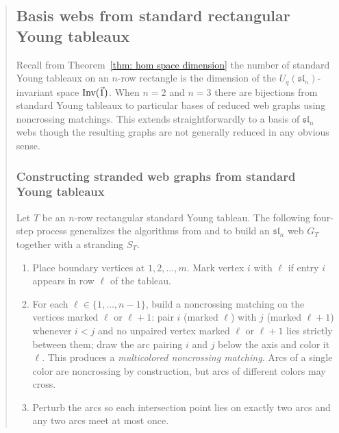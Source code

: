 \documentclass[letterpaper,11pt]{amsart}
\newcommand{\uq}{U_q(\mathfrak{sl}_n)} %
\begin{document}
\begin{abstract}
\subsection{Basis webs from standard rectangular Young tableaux}\label{section: basis webs}
 
Recall from Theorem~\ref{thm: hom space dimension} the number of standard Young tableaux on an $n$-row rectangle is the dimension of the $\uq$-invariant space $\textup{Inv}(\vec{1})$. When $n=2$ and $n=3$ there are bijections from standard Young tableaux to particular bases of reduced web graphs using noncrossing matchings. This extends straightforwardly to a basis of $\mathfrak{sl}_n$ webs though the resulting graphs are not generally reduced in any obvious sense.
 
\subsubsection{Constructing stranded web graphs from standard Young tableaux}\label{section: constructing basis webs from tableaux}
 
Let $T$ be an $n$-row rectangular standard Young tableau. The following four-step process generalizes the algorithms from \cite{RTSpringerRep} and \cite{TSimpleBij} to build an $\mathfrak{sl}_n$ web $G_T$ together with a stranding $S_T$.
\begin{enumerate}
\item Place boundary vertices at $1, 2, \ldots, m$. Mark vertex $i$ with $\ell$ if entry $i$ appears in row $\ell$ of the tableau.
 
\item For each $\ell\in\{1,\ldots,n-1\}$, build a noncrossing matching on the vertices marked $\ell$ or $\ell+1$: pair $i$ (marked $\ell$) with $j$ (marked $\ell+1$) whenever $i<j$ and no unpaired vertex marked $\ell$ or $\ell+1$ lies strictly between them; draw the arc pairing $i$ and $j$ below the axis and color it $\ell$. This produces a \emph{multicolored noncrossing matching}. Arcs of a single color are noncrossing by construction, but arcs of different colors may cross.
 
\item Perturb the arcs so each intersection point lies on exactly two arcs and any two arcs meet at most once.
 

\end{enumerate}
\end{abstract}
\end{document}
